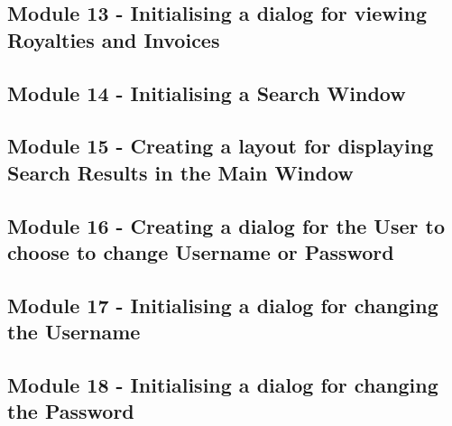 \begin{landscape}
\begin{scriptsize}
 \label{ssec:Items.py}

\subsection{Module 13 - Initialising a dialog for viewing Royalties and Invoices}


\subsection{Module 14 - Initialising a Search Window}

 \label{ssec:SearchDatabase.py}

\subsection{Module 15 - Creating a layout for displaying Search Results in the Main Window}

 \label{ssec:SearchResults.py}

\subsection{Module 16 - Creating a dialog for the User to choose to change Username or Password}


\subsection{Module 17 - Initialising a dialog for changing the Username}

 \label{ssec:ChangeUsername.py}

\subsection{Module 18 - Initialising a dialog for changing the Password}

 \label{ssec:ChangePassword.py}
\end{scriptsize}
\end{landscape}






